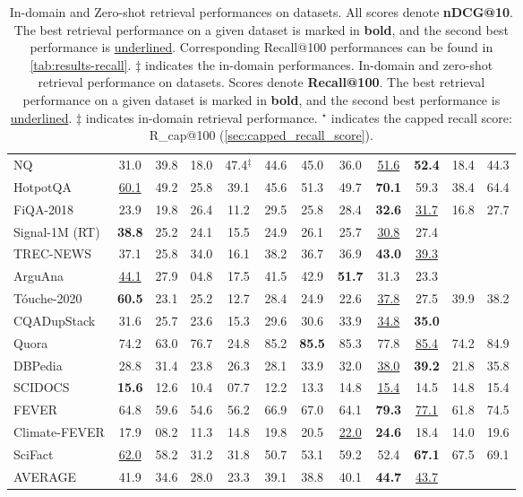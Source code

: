 \begin{table}[t!]
{\begin{tabular}{@{}l  c  c  c c c c c  c c  c c@{}}
   NQ            & 31.0 & 39.8 & 18.0 & 47.4$^\ddagger$ & 44.6 & 45.0 & 36.0 & \underline{51.6} & \textbf{52.4} &  18.4 & 44.3 \\
   HotpotQA      & \underline{60.1} & 49.2 & 25.8 & 39.1 & 45.6 & 51.3 & 49.7 & \textbf{70.1} & 59.3 & 38.4 & \colorbox{green!30}{64.4} \\
   FiQA-2018     & 23.9 & 19.8 & 26.4 & 11.2 & 29.5 & 25.8 & 28.4 & \textbf{32.6} & \underline{31.7} & 16.8 & 27.7\\
   Signal-1M (RT)& \textbf{38.8} & 25.2 & 24.1 & 15.5 & 24.9 & 26.1 & 25.7 & \underline{30.8} & 27.4 \\
   TREC-NEWS     & 37.1 & 25.8 & 34.0 & 16.1 & 38.2 & 36.7 & 36.9 & \textbf{43.0} & \underline{39.3} \\
   ArguAna       & \underline{44.1} & 27.9 & 04.8 & 17.5 & 41.5 & 42.9 & \textbf{51.7} & 31.3 & 23.3 \\
   T\'ouche-2020 & \textbf{60.5} & 23.1 & 25.2 & 12.7 & 28.4 & 24.9 & 22.6 & \underline{37.8} & 27.5 & 39.9 & 38.2\\
   CQADupStack   & 31.6 & 25.7 & 23.6 & 15.3 & 29.6 & 30.6 & 33.9 & \underline{34.8} & \textbf{35.0} \\
   Quora         & 74.2 & 63.0 & 76.7 & 24.8 & 85.2 & \textbf{85.5} & 85.3 & 77.8 & \underline{85.4} & 74.2 & 84.9 \\
   DBPedia       & 28.8 & 31.4 & 23.8 & 26.3 & 28.1 & 33.9 & 32.0 & \underline{38.0} & \textbf{39.2} & 21.8 & \colorbox{green!30}{35.8} \\
   SCIDOCS       & \textbf{15.6} & 12.6 & 10.4 & 07.7 & 12.2 & 13.3 & 14.8 & \underline{15.4} & 14.5 & 14.8 & 15.4 \\
   FEVER         & 64.8 & 59.6 & 54.6 & 56.2 & 66.9 & 67.0 & 64.1 & \textbf{79.3} & \underline{77.1} & 61.8 & \colorbox{green!30}{74.5} \\
   Climate-FEVER & 17.9 & 08.2 & 11.3 & 14.8 & 19.8 & 20.5 & \underline{22.0} & \textbf{24.6} & 18.4 & 14.0 & 19.6 \\
   SciFact       & \underline{62.0} & 58.2 & 31.2 & 31.8 & 50.7 & 53.1 & 59.2 & 52.4 & \textbf{67.1} & 67.5 & {69.1} \\ \midrule
   AVERAGE       & 41.9 & 34.6 & 28.0 & 23.3 & 39.1 & 38.8 & 40.1 & \textbf{44.7} & \underline{43.7} \\
        \bottomrule
    \end{tabular}}
    \caption{In-domain and Zero-shot retrieval performances on \beir datasets. All scores denote \textbf{nDCG@10}. The best retrieval performance on a given dataset is marked in \textbf{bold}, and the second best performance is \underline{underlined}. Corresponding Recall@100 performances can be found in \autoref{tab:results-recall}. $\ddagger$ indicates the in-domain performances. In-domain and zero-shot retrieval performance on \beir datasets. Scores denote \textbf{Recall@100}. The best retrieval performance on a given dataset is marked in \textbf{bold}, and the second best performance is \underline{underlined}. $\ddagger$ indicates in-domain retrieval performance. $^\star$ indicates the capped recall score: R\_cap@100 (\autoref{sec:capped_recall_score}). }

\end{table}
